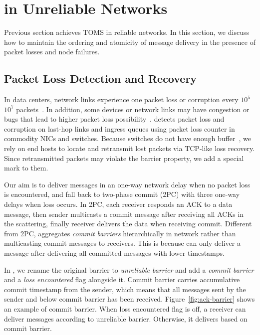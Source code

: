 \section{\sys in Unreliable Networks}
\label{sec:design-unreliable}

Previous section achieves TOMS in reliable networks.
In this section, we discuss how to maintain the ordering and atomicity of message delivery in the presence of packet losses and node failures.

\subsection{Packet Loss Detection and Recovery}
\label{sec:lossy}

In data centers, network links experience one packet loss or corruption every $10^5$ \texttildelow $10^7$ packets~\cite{zhuo2017understanding}.
In addition, some devices or network links may have congestion or bugs that lead to higher packet loss possibility~\cite{guo2015pingmesh}.
\sys detects packet loss and corruption on last-hop links and ingress queues using packet loss counter in commodity NICs and switches.
Because switches do not have enough buffer~\cite{bai2017congestion}, we rely on end hosts to locate and retransmit lost packets via TCP-like loss recovery.
Since retransmitted packets may violate the barrier property, we add a special mark to them.

Our aim is to deliver messages in an one-way network delay when no packet loss is encountered, and fall back to two-phase commit (2PC) with three one-way delays when loss occurs.
In 2PC, each receiver responds an ACK to a data message, then sender multicasts a commit message after receiving all ACKs in the scattering, finally receiver delivers the data when receiving commit.
Different from 2PC, \sys aggregates \textit{commit barriers} hierarchically in network rather than multicasting commit messages to receivers.
This is because \sys can only deliver a message after delivering all committed messages with lower timestamps.

In \sys, we rename the original barrier to \textit{unreliable barrier} and add a \textit{commit barrier} and a \textit{loss encountered} flag alongside it.
Commit barrier carries accumulative commit timestamp from the sender, which means that all messages sent by the sender and below commit barrier has been received.
Figure~\ref{fig:ack-barrier} shows an example of commit barrier.
When loss encountered flag is off, a receiver can deliver messages according to unreliable barrier.
Otherwise, it delivers based on commit barrier.


